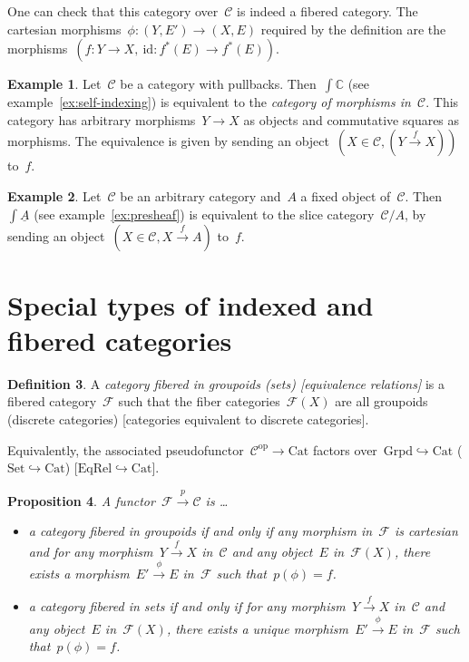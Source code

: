 \documentclass[a4paper,english,12pt]{scrartcl}
\theoremstyle{definition}
\newtheorem{defn}{Definition}[section]
\newtheorem{ex}[defn]{Example}
\theoremstyle{plain}
\newtheorem{prop}[defn]{Proposition}
\theoremstyle{remark}
\newcommand{\CC}{\mathbb{C}}
\newcommand{\C}{\mathcal{C}}
\newcommand{\F}{\mathcal{F}}
\newcommand{\id}{\mathrm{id}}
\newcommand{\op}{\mathrm{op}}
\newcommand{\xra}[1]{\xrightarrow{#1}}
\newcommand{\Set}{\mathrm{Set}}
\newcommand{\Cat}{\mathrm{Cat}}
\newcommand{\ul}[1]{\underline{#1}}
\begin{document}
One can check that this category over~$\C$ is indeed a fibered category. The
cartesian morphisms~$\phi : (Y,E') \to (X,E)$ required by the definition are
the morphisms~$(f : Y \to X,\ \id : f^*(E) \to f^*(E))$.

\begin{ex}Let~$\C$ be a category with pullbacks. Then~$\int \CC$ (see
example~\ref{ex:self-indexing}) is equivalent to the \emph{category of morphisms
in~$\C$}. This category has arbitrary morphisms~$Y \to X$ as objects and commutative
squares as morphisms. The equivalence is given by sending an object~$(X \in \C,
(Y \xra{f} X))$ to~$f$.
\end{ex}

\begin{ex}Let~$\C$ be an arbitrary category and~$A$ a fixed object of~$\C$.
Then~$\int \ul{A}$ (see example~\ref{ex:presheaf}) is
equivalent to the slice category~$\C/A$, by sending an object~$(X \in \C, X
\xra{f} A)$ to~$f$.
\end{ex}


\section{Special types of indexed and fibered categories}

\begin{defn}A \emph{category fibered in groupoids (sets) [equivalence relations]}
is a fibered category~$\F$ such that the fiber categories~$\F(X)$ are all
groupoids (discrete categories) [categories equivalent to discrete
categories].\end{defn}

Equivalently, the associated pseudofunctor~$\C^\op \to \Cat$ factors
over~$\mathrm{Grpd} \hookrightarrow \Cat$ ($\Set \hookrightarrow
\Cat$) [$\mathrm{EqRel} \hookrightarrow \Cat$].

\begin{prop}A functor~$\F \xra{p} \C$ is \ldots
\begin{itemize}
\item a category fibered in groupoids if and only if any morphism
in~$\F$ is cartesian and for any morphism~$Y \xra{f} X$ in~$\C$ and any
object~$E$ in~$\F(X)$, there exists a morphism~$E' \xra{\phi} E$ in~$\F$ such
that~$p(\phi) = f$.
\item a category fibered in sets if and only if
for any morphism~$Y \xra{f} X$ in~$\C$ and any
object~$E$ in~$\F(X)$, there exists a unique morphism~$E' \xra{\phi} E$ in~$\F$ such
that~$p(\phi) = f$.
\end{itemize}
\end{prop}
\end{document}
